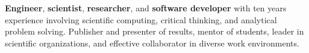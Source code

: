 \vspace{3mm}
\begin{center}
	\begin{minipage}{1.0\textwidth}
		\begin{justify}
			\large
			\textbf{Engineer}, \textbf{scientist}, \textbf{researcher}, and \textbf{software developer} with ten years experience involving scientific computing, critical thinking, and analytical problem solving.
			Publisher and presenter of results, mentor of students, leader in scientific organizations, and effective collaborator in diverse work environments.
		\end{justify}
	\end{minipage}%
\end{center}
